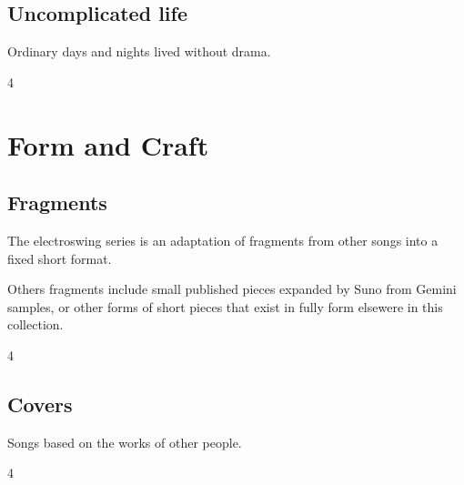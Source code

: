 \documentclass[a4paper,landscape]{memoir}
\begin{document}
\chapter{Uncomplicated life}
Ordinary days and nights lived without drama.
\clearpage\begin{multicols*}{4}











\end{multicols*}

\part{Form and Craft}

\chapter{Fragments}
The electroswing series is an adaptation of fragments from other songs into a fixed short format.

Others fragments include small published pieces expanded by Suno from Gemini samples, or other forms of short pieces that exist in fully form elsewere in this collection.
\clearpage\begin{multicols*}{4}
























\end{multicols*}

\chapter{Covers}
Songs based on the works of other people.
\clearpage\begin{multicols*}{4}





\end{multicols*}

\appendix

\backmatter
\printindex[songs]
\clearpage
\printindex[tags]
\end{document}
